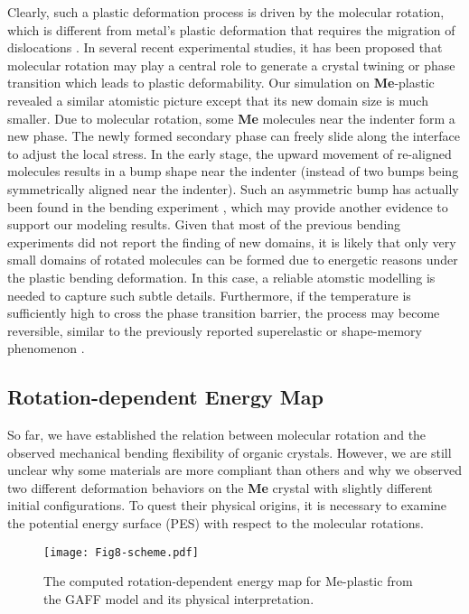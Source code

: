 \documentclass[prb,superscriptaddress,longbibliography, twocolumn]{revtex4-1}
\begin{document}
Clearly, such a plastic deformation process is driven by the molecular rotation, which is different from metal's plastic deformation that requires the migration of dislocations \cite{li2018sample, Zhang_2014, NOHRING2016140, ZHUO2018331, KATAKAM2020106674, HE20223687}. In several recent experimental studies, it has been proposed that molecular rotation may play a central role to generate a crystal twining \cite{takamizawa2018superplasticity} or phase transition \cite{Takamizawa2013Superelastic, karothu2016shape} which leads to plastic deformability. Our simulation on \textbf{Me}-plastic revealed a similar atomistic picture except that its new domain size is much smaller. Due to molecular rotation, some \textbf{Me} molecules near the indenter form a new phase. The newly formed secondary phase can freely slide along the interface to adjust the local stress. In the early stage, the upward movement of re-aligned molecules results in a bump shape near the indenter (instead of two bumps being symmetrically aligned near the indenter). Such an asymmetric bump has actually been found in the bending experiment \cite{devarapalli2019remarkably}, which may provide another evidence to support our modeling results. Given that most of the previous bending experiments did not report the finding of new domains, it is likely that only very small domains of rotated molecules can be formed due to energetic reasons under the plastic bending deformation. In this case, a reliable atomstic modelling is needed to capture such subtle details. Furthermore, if the temperature is sufficiently high to cross the phase transition barrier, the process may become reversible, similar to the previously reported superelastic or shape-memory phenomenon \cite{Takamizawa2013Superelastic, karothu2016shape, takamizawa2018superplasticity}.

\subsection{Rotation-dependent Energy Map}
So far, we have established the relation between molecular rotation and the observed mechanical bending flexibility of organic crystals. However, we are still unclear why some materials are more compliant than others and why we observed two different deformation behaviors on the \textbf{Me} crystal with slightly different initial configurations. To quest their physical origins, it is necessary to examine the potential energy surface (PES) with respect to the molecular rotations. 

\begin{figure}[htbp]
\centering
\texttt{[image: Fig8-scheme.pdf]}
\caption{\label{Fig8} The computed rotation-dependent energy map for Me-plastic from the GAFF model and its physical interpretation.}
\end{figure}
\end{document}
